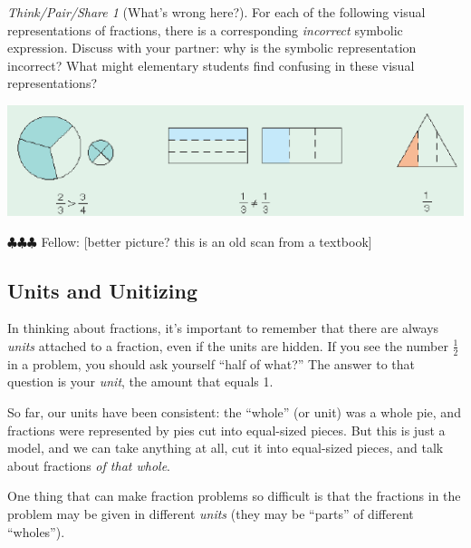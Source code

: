 \documentclass[10pt, reqno]{amsart}
\theoremstyle{remark}
\newtheorem*{thinkpair*}{Think/Pair/Share}
\theoremstyle{definition}
\numberwithin{equation}{section}  %
\newcommand{\fellow}[1]{{\color{magenta} \sf $\clubsuit\clubsuit\clubsuit$ Fellow: [#1]}}
\begin{document}
\begin{thinkpair*}[What's wrong here?]
For each of the following visual representations of fractions, there is a corresponding \emph{incorrect} symbolic expression.   Discuss with your partner: why is the symbolic representation incorrect?  What might elementary students find confusing in these visual representations?

\begin{center}
\includegraphics[height=3 cm]{fractionreps}
\end{center}

\fellow{better picture?  this is an old scan from a textbook}

\end{thinkpair*}




\subsection{Units and Unitizing}
In thinking about fractions, it's important to remember that there are always \emph{units} attached to a fraction, even if the units are hidden.  If you see the number $\frac 1 2$ in a problem, you should ask yourself ``half of what?''  The answer to that question is your \emph{unit}, the amount that equals 1.


So far, our units have been consistent: the ``whole'' (or unit) was a whole pie, and fractions were represented by pies cut into equal-sized pieces.  But this is just a model, and we can take anything at all, cut it into equal-sized pieces, and talk about fractions \emph{of that whole}.

One thing that can make fraction problems  so difficult is that the fractions in the problem may be given in different \emph{units} (they may be ``parts'' of different ``wholes'').  
\end{document}
